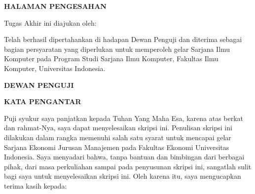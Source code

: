 \documentclass[main]{subfiles}
\begin{document}

\clearpage
\begin{center}\bfseries HALAMAN PENGESAHAN\end{center}
\vspace{0.8cm}
\onehalfspacing
\noindent Tugas Akhir ini diajukan oleh:
\vspace{0.5cm}

\vspace{0.5cm}

\noindent Telah berhasil dipertahankan di hadapan Dewan Penguji dan diterima
sebagai bagian persyaratan yang diperlukan untuk memperoleh gelar Sarjana Ilmu
Komputer pada Program Studi Sarjana Ilmu Komputer, Fakultas Ilmu Komputer,
Universitas Indonesia.
\vspace{1cm}

\begin{center}\bfseries DEWAN PENGUJI\end{center}
\vspace{0.8cm}


\clearpage
{}
\begin{center}\bfseries KATA PENGANTAR\end{center}
\vspace{0.8cm}
\onehalfspacing
\noindent Puji syukur saya panjatkan kepada Tuhan Yang Maha Esa, karena atas
berkat dan rahmat-Nya, saya dapat menyelesaikan skripsi ini. Penulisan skripsi
ini dilakukan dalam rangka memenuhi salah satu syarat untuk mencapai gelar
Sarjana Ekonomi Jurusan Manajemen pada Fakultas Ekonomi Universitas Indonesia.
Saya menyadari bahwa, tanpa bantuan dan bimbingan dari berbagai pihak, dari masa
perkuliahan sampai pada penyusunan skripsi ini, sangatlah sulit bagi saya untuk
menyelesaikan skripsi ini. Oleh karena itu, saya mengucapkan terima kasih kepada:
\end{document}
